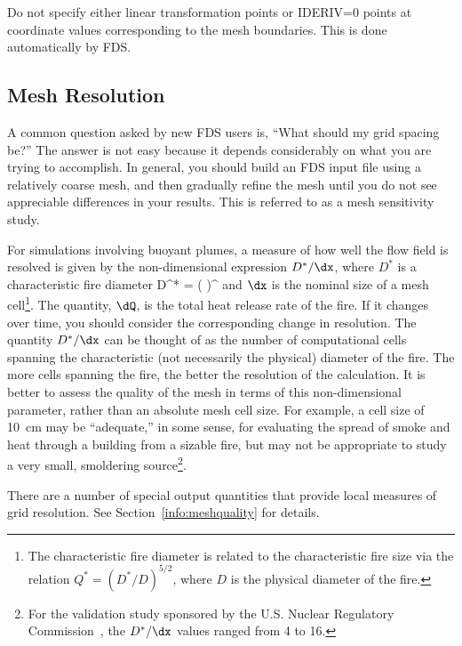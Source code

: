 \documentclass[11pt]{book}
\begin{document}
Do not specify either linear transformation points or {\ct IDERIV=0} points at coordinate values corresponding to
the mesh boundaries. This is done automatically by FDS.


\subsection{Mesh Resolution}
\label{info:Mesh_Resolution}

A common question asked by new FDS users is, ``What should my grid spacing be?''
The answer is not easy because it depends considerably on what you are trying
to accomplish. In general, you should build an FDS input file using a relatively
coarse mesh, and then gradually refine the mesh until you do not see
appreciable differences in your results. This is referred to as a mesh sensitivity study.

For simulations involving buoyant plumes, a measure of how well the flow field is resolved is given by the
non-dimensional expression $D^*/\dx$, where $D^*$ is a characteristic
fire diameter
\be D^* = \left(
     \right)^  \ee
and $\dx$ is the nominal size of a mesh cell\footnote{The characteristic
fire diameter is related to the characteristic fire size via the
relation $Q^* = (D^*/D)^{5/2}$, where $D$ is the physical diameter of the
fire.}. The quantity, $\dQ$, is the total heat release rate of the fire. If it changes over time, you should consider the
corresponding change in resolution. The quantity $D^*/\dx$ can be thought of as the number of computational cells
spanning the characteristic (not necessarily the physical) diameter of the fire.
The more cells spanning the fire, the better the resolution of the
calculation. It is better to assess the quality of the mesh in terms
of this non-dimensional parameter, rather than an absolute mesh cell size.
For example, a cell size of 10~cm may be ``adequate,'' in some sense,
for evaluating the spread of smoke and heat through a building from a
sizable fire, but may not be appropriate to study a very small, smoldering source\footnote{For the validation study sponsored by the
U.S. Nuclear Regulatory Commission~\cite{NUREG_1824}, the $D^*/\dx$ values ranged from 4 to 16.}.


There are a number of special output quantities that provide local measures of grid resolution. See Section~\ref{info:meshquality} for details.




\clearpage
\end{document}
